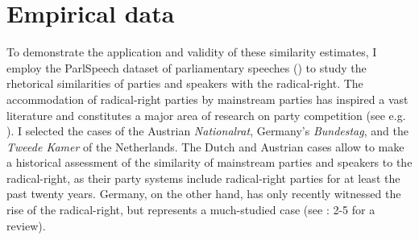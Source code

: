\documentclass{article}
\begin{document}
\section{Empirical data}
To demonstrate the application and validity of these similarity estimates, I employ the ParlSpeech dataset of parliamentary speeches (\cite{Rauh2020}) to study the rhetorical similarities of parties and speakers with the radical-right. The accommodation of radical-right parties by mainstream parties has inspired a vast literature and constitutes a major area of research on party competition (see e.g. \cite{Arzheimer2009, Bale2010e, Dahlstrom2012a, Harmel1997a, Krause2019accomodation, Meguid2005, Schumacher2014a, Spoon2020a, VanDerBrug2005b, VanSpanje2010, Wagner2017}). I selected the cases of the Austrian \textit{Nationalrat}, Germany's \textit{Bundestag}, and the \textit{Tweede Kamer} of the Netherlands. The Dutch and Austrian cases allow to make a historical assessment of the similarity of mainstream parties and speakers to the radical-right, as their party systems include radical-right parties for at least the past twenty years. Germany, on the other hand, has only recently witnessed the rise of the radical-right, but represents a much-studied case (see \cite{Arzheimer2019}: 2-5 for a review).\par
\end{document}
